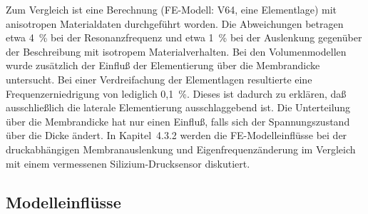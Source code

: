 Zum Vergleich ist eine Berechnung (FE-Modell: V64, eine Elementlage)
mit anisotropen Materialdaten \cite{LB82}
durchgeführt worden. Die Abweichungen betragen etwa 4~\% bei der
Resonanzfrequenz und etwa 1~\% bei der Auslenkung gegenüber der
Beschreibung mit isotropem Materialverhalten.
Bei den Volumenmodellen wurde
zusätzlich der Einfluß der Elementierung über die Membrandicke
untersucht. Bei einer Verdreifachung der Elementlagen resultierte
eine Frequenzerniedrigung von lediglich 0,1~\%. Dieses ist dadurch zu
erklären, daß ausschließlich die laterale Elementierung ausschlaggebend
ist. Die Unterteilung über die Membrandicke hat nur einen Einfluß, falls
sich der Spannungszustand über die Dicke ändert. In Kapitel~4.3.2
werden die FE-Modelleinflüsse bei der druckabhängigen Membranauslenkung
und Eigenfrequenzänderung im Vergleich mit einem vermessenen
Silizium-Drucksensor diskutiert.


\subsection{Modelleinflüsse}
\label{modelleinfluesse}

